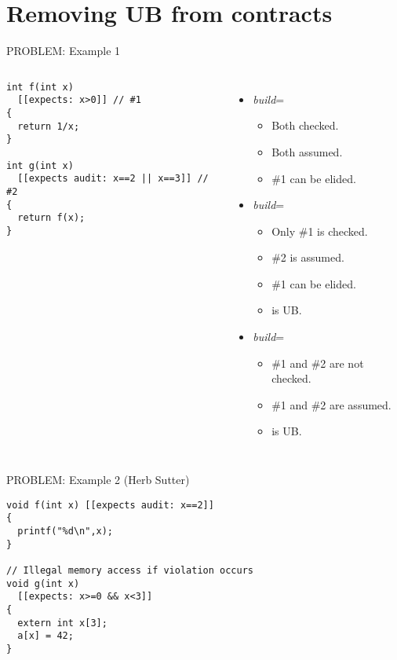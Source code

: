 \section{Removing UB from contracts}

\begin{frame}[t,fragile]{PROBLEM: Example 1}
\vspace{-1em}
\begin{columns}[T]

\begin{block}{}
\begin{lstlisting}
int f(int x) 
  [[expects: x>0]] // #1
{
  return 1/x;
}

int g(int x) 
  [[expects audit: x==2 || x==3]] // #2
{
  return f(x);
}
\end{lstlisting}
\end{block}

\begin{itemize}
  \item \emph{build}=
    \begin{itemize}
      \item Both checked.
      \item Both assumed.
      \item \#1 can be elided.
    \end{itemize}
  \pause\vfill
  \item \emph{build}=
    \begin{itemize}
      \item Only \#1 is checked.
      \item \#2 is assumed.
      \item \#1 can be elided.
      \item {} is \alert{UB}.
    \end{itemize}
  \pause\vfill
  \item \emph{build}=
    \begin{itemize}
      \item \#1 and \#2 are not checked.
      \item \#1 and \#2 are assumed.
      \item {} is \alert{UB}.
    \end{itemize}
\end{itemize}
\end{columns}
\end{frame}

\begin{frame}[t,fragile]{PROBLEM: Example 2 (Herb Sutter)}
\begin{block}{}
\begin{lstlisting}
void f(int x) [[expects audit: x==2]]
{ 
  printf("%d\n",x); 
}

// Illegal memory access if violation occurs
void g(int x) 
  [[expects: x>=0 && x<3]]
{
  extern int x[3];
  a[x] = 42;
}
\end{lstlisting}
\end{block}
\end{frame}


